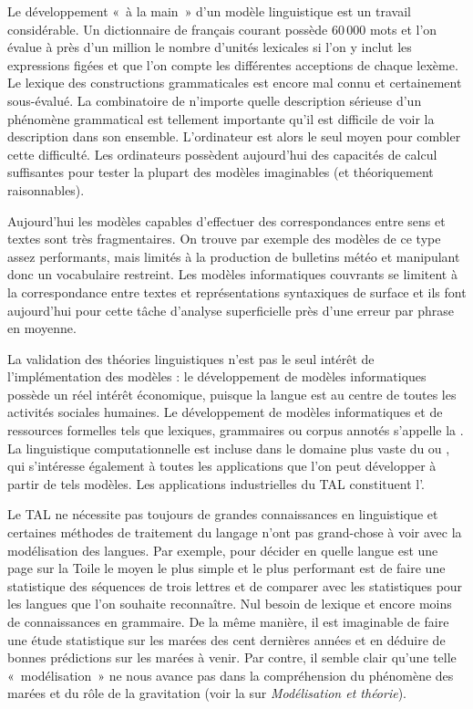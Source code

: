 Le développement «~à la main~» d’un modèle linguistique est un travail considérable. Un dictionnaire de français courant possède 60\,000 mots et l’on évalue à près d’un million le nombre d’unités lexicales si l’on y inclut les expressions figées et que l’on compte les différentes acceptions de chaque lexème. Le lexique des constructions grammaticales est encore mal connu et certainement sous-évalué. La combinatoire de n’importe quelle description sérieuse d’un phénomène grammatical est tellement importante qu’il est difficile de voir la description dans son ensemble. L’ordinateur est alors le seul moyen pour combler cette difficulté. Les ordinateurs possèdent aujourd’hui des capacités de calcul suffisantes pour tester la plupart des modèles imaginables (et théoriquement raisonnables).

Aujourd’hui les modèles capables d’effectuer des correspondances entre sens et textes sont très fragmentaires. On trouve par exemple des modèles de ce type assez performants, mais limités à la production de bulletins météo et manipulant donc un vocabulaire restreint. Les modèles informatiques couvrants se limitent à la correspondance entre textes et représentations syntaxiques de surface et ils font aujourd’hui pour cette tâche d’analyse superficielle près d’une erreur par phrase en moyenne.

La validation des théories linguistiques n’est pas le seul intérêt de l’implémentation des modèles : le développement de modèles informatiques possède un réel intérêt économique, puisque la langue est au centre de toutes les activités sociales humaines. Le développement de modèles informatiques et de ressources formelles tels que lexiques, grammaires ou corpus annotés s’appelle la . La linguistique computationnelle est incluse dans le domaine plus vaste du  ou , qui s’intéresse également à toutes les applications que l’on peut développer à partir de tels modèles. Les applications industrielles du TAL constituent l’.

Le TAL ne nécessite pas toujours de grandes connaissances en linguistique et certaines méthodes de traitement du langage n’ont pas grand-chose à voir avec la modélisation des langues. Par exemple, pour décider en quelle langue est une page sur la Toile le moyen le plus simple et le plus performant est de faire une statistique des séquences de trois lettres et de comparer avec les statistiques pour les langues que l’on souhaite reconnaître. Nul besoin de lexique et encore moins de connaissances en grammaire. De la même manière, il est imaginable de faire une étude statistique sur les marées des cent dernières années et en déduire de bonnes prédictions sur les marées à venir. Par contre, il semble clair qu’une telle «~modélisation~» ne nous avance pas dans la compréhension du phénomène des marées et du rôle de la gravitation (voir la  sur \textit{Modélisation et théorie}).

